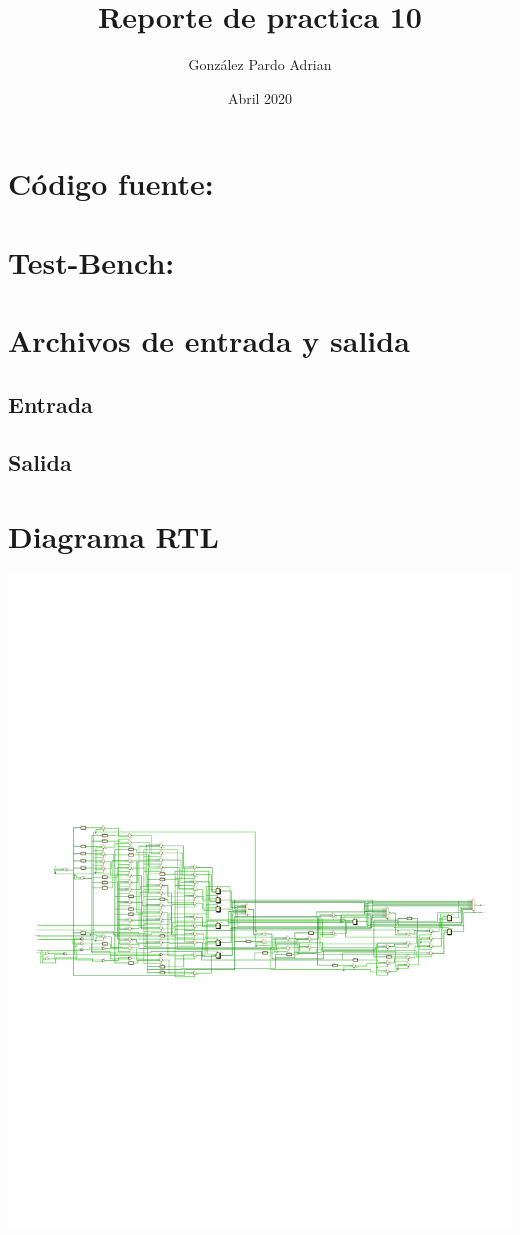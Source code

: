 \documentclass[8pt,executivepaper]{article}
\author{González Pardo Adrian}
\date{Abril 2020}
\title{Reporte de practica 10}
\begin{document}
\maketitle
\section{Código fuente:}
\begin{center}
  
\end{center}
\section{Test-Bench:}
\begin{center}
  
\end{center}
\section{Archivos de entrada y salida}
\subsection{Entrada}
\begin{center}
  
\end{center}
\clearpage
\subsection{Salida}
\begin{center}
  
\end{center}
\section{Diagrama RTL}
\begin{center}
  \includegraphics[scale=0.65]{sources/esquematicaRTL.pdf}
\end{center}
\end{document}
